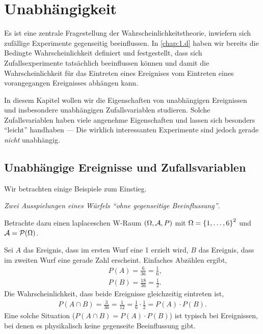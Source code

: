 \chapter{Unabhängigkeit}
\label{chap:5}

Es ist eine zentrale Fragestellung der Wahrscheinlichkeitstheorie, inwiefern
sich zufällige Experimente gegenseitig beeinflussen. In \ref{chap:1.d}
haben wir bereits die Bedingte Wahrscheinlichkeit definiert und festgestellt,
dass sich Zufallsexperimente tatsächlich beeinflussen können und damit die
Wahrscheinlichkeit für das Eintreten eines Ereignises vom Eintreten eines
vorangegangen Ereignisses abhängen kann.

In diesem Kapitel wollen wir die Eigenschaften von unabhängigen Ereignissen und
insbesondere unabhängigen Zufallsvariablen studieren. Solche Zufallsvariablen
haben viele angenehme Eigenschaften und lassen sich besonders ``leicht''
handhaben ---
Die wirklich interessanten Experimente sind jedoch gerade
\textit{nicht} unabhängig.

\clearpage

\section{Unabhängige Ereignisse und Zufallsvariablen}
\label{chap:5.a}

Wir betrachten einige Beispiele zum Einstieg.

\begin{bsp}
\textit{Zwei Ausspielungen eines Würfels ``ohne gegenseitige Beeinflussung''}.
  
Betrachte dazu einen laplaceschen W-Raum $(\Omega,\AA,P)$ mit
$\Omega=\setd{1,\ldots,6}^2$ und $\AA=\PP(\Omega)$.

Sei $A$ das Ereignis, dass im ersten Wurf eine 1 erzielt wird, $B$ das
Ereignis, dass im zweiten Wurf eine gerade Zahl erscheint. Einfaches Abzählen
ergibt,
\begin{align*}
&P(A) = \frac{6}{36} = \frac{1}{6},\\
&P(B) = \frac{18}{36} = \frac{1}{2}.
\end{align*}
Die Wahrscheinlichkeit, dass beide Ereignisse gleichzeitig eintreten ist,
\begin{align*}
P(A\cap B) = \frac{3}{36} = \frac{1}{12} = \frac{1}{6}\cdot\frac{1}{2} =
P(A)\cdot P(B).
\end{align*}
Eine solche Situation ($P(A\cap B)=P(A)\cdot P(B)$) ist typisch bei Ereignissen,
bei denen es physikalisch keine gegenseite Beeinflussung gibt.\bsphere
\end{bsp}


